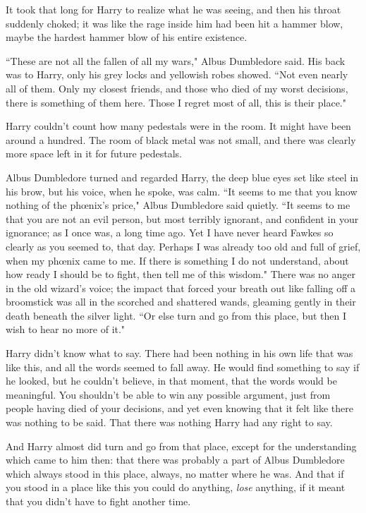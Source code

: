 It took that long for Harry to realize what he was seeing, and then his throat suddenly choked; it was like the rage inside him had been hit a hammer blow, maybe the hardest hammer blow of his entire existence.

``These are not all the fallen of all my wars," Albus Dumbledore said. His back was to Harry, only his grey locks and yellowish robes showed. ``Not even nearly all of them. Only my closest friends, and those who died of my worst decisions, there is something of them here. Those I regret most of all, this is their place."

Harry couldn't count how many pedestals were in the room. It might have been around a hundred. The room of black metal was not small, and there was clearly more space left in it for future pedestals.

Albus Dumbledore turned and regarded Harry, the deep blue eyes set like steel in his brow, but his voice, when he spoke, was calm. ``It seems to me that you know nothing of the phœnix's price," Albus Dumbledore said quietly. ``It seems to me that you are not an evil person, but most terribly ignorant, and confident in your ignorance; as I once was, a long time ago. Yet I have never heard Fawkes so clearly as you seemed to, that day. Perhaps I was already too old and full of grief, when my phœnix came to me. If there is something I do not understand, about how ready I should be to fight, then tell me of this wisdom." There was no anger in the old wizard's voice; the impact that forced your breath out like falling off a broomstick was all in the scorched and shattered wands, gleaming gently in their death beneath the silver light. ``Or else turn and go from this place, but then I wish to hear no more of it."

Harry didn't know what to say. There had been nothing in his own life that was like this, and all the words seemed to fall away. He would find something to say if he looked, but he couldn't believe, in that moment, that the words would be meaningful. You shouldn't be able to win any possible argument, just from people having died of your decisions, and yet even knowing that it felt like there was nothing to be said. That there was nothing Harry had any right to say.

And Harry almost did turn and go from that place, except for the understanding which came to him then: that there was probably a part of Albus Dumbledore which always stood in this place, always, no matter where he was. And that if you stood in a place like this you could do anything, \emph{lose} anything, if it meant that you didn't have to fight another time.


